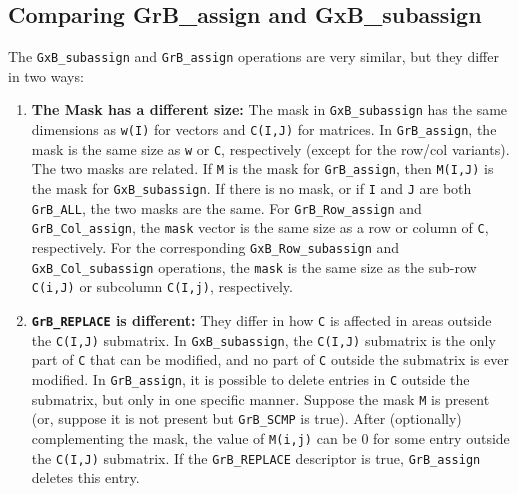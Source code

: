 \documentclass[12pt]{article}
\begin{document}
\subsection{Comparing {\sf GrB\_assign} and {\sf GxB\_subassign}} %
\label{compare_assign}


The \verb'GxB_subassign' and \verb'GrB_assign' operations are very similar, but
they differ in two ways:

\begin{enumerate}
\item {\bf The Mask has a different size:}
    The mask in \verb'GxB_subassign' has the same dimensions as \verb'w(I)' for
    vectors and \verb'C(I,J)' for matrices.  In \verb'GrB_assign', the mask is
    the same size as \verb'w' or \verb'C', respectively (except for the row/col
    variants).  The two masks are related.  If \verb'M' is the mask for
    \verb'GrB_assign', then \verb'M(I,J)' is the mask for \verb'GxB_subassign'.
    If there is no mask, or if \verb'I' and \verb'J' are both \verb'GrB_ALL',
    the two masks are the same.
    For \verb'GrB_Row_assign' and \verb'GrB_Col_assign', the \verb'mask' vector
    is the same size as a row or column of \verb'C', respectively.  For the
    corresponding \verb'GxB_Row_subassign' and \verb'GxB_Col_subassign'
    operations, the \verb'mask' is the same size as the sub-row \verb'C(i,J)' or
    subcolumn \verb'C(I,j)', respectively.

\item {\bf \verb'GrB_REPLACE' is different:}
    They differ in how \verb'C' is affected in areas outside the \verb'C(I,J)'
    submatrix.  In \verb'GxB_subassign', the \verb'C(I,J)' submatrix is the
    only part of \verb'C' that can be modified, and no part of \verb'C' outside
    the submatrix is ever modified.  In \verb'GrB_assign', it is possible to
    delete entries in \verb'C' outside the submatrix, but only in one specific
    manner.  Suppose the mask \verb'M' is present (or, suppose it is not
    present but \verb'GrB_SCMP' is true).  After (optionally) complementing the
    mask, the value of \verb'M(i,j)' can be 0 for some entry outside the
    \verb'C(I,J)' submatrix.  If the \verb'GrB_REPLACE' descriptor is
    true, \verb'GrB_assign' deletes this entry.

\end{enumerate}
\end{document}
